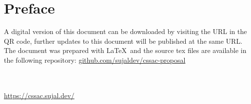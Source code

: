 \onecolumn

\chapter*{Preface}
A digital version of this document can be downloaded by visiting the URL in the QR code, further updates to this
document will be published at the same URL. The document was prepared with \LaTeX\ and the source tex files are
available in the following repository:
\href{https://github.com/sujaldev/cssac-proposal}{\color{blue}\url{github.com/sujaldev/cssac-proposal}}
\\\\
\begin{center}
    \\[20pt]
    \href{https://cssac.sujal.dev/}{\color{blue}\url{https://cssac.sujal.dev/}}
\end{center}

\twocolumn
